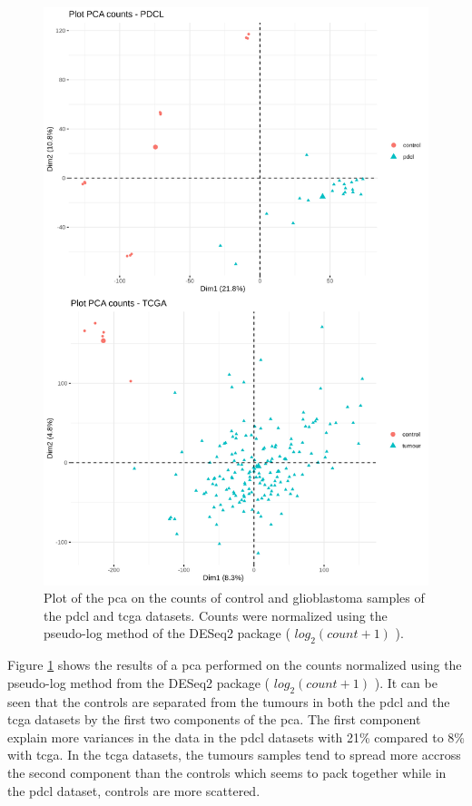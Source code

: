 \begin{figure}
    \begin{center}
        \includegraphics[height=0.8\textheight]{img/pca_plot}
        \caption{
            Plot of the \acrshort{pca} on the counts of control and glioblastoma samples of the \acrshort{pdcl} and \acrshort{tcga} datasets.
            Counts were normalized using the pseudo-log method of the DESeq2 package ( $log_2(count+1)$ ).
        }
        \label{fig:pca-plot}
    \end{center}
\end{figure}

Figure \ref*{fig:pca-plot} shows the results of a \acrfull{pca} performed on the counts normalized using the pseudo-log method from the DESeq2 package ( $log_2(count+1)$ ).
It can be seen that the controls are separated from the tumours  in both the \acrshort{pdcl} and the \acrshort{tcga} datasets by the first two components of the \acrshort{pca}.
The first component explain more variances in the data in the \acrshort{pdcl} datasets with 21\% compared to 8\% with \acrshort{tcga}.
In the \acrshort{tcga} datasets, the tumours samples tend to spread more accross the second component than the controls which seems to pack together while in the \acrshort{pdcl} dataset, controls are more scattered. 

